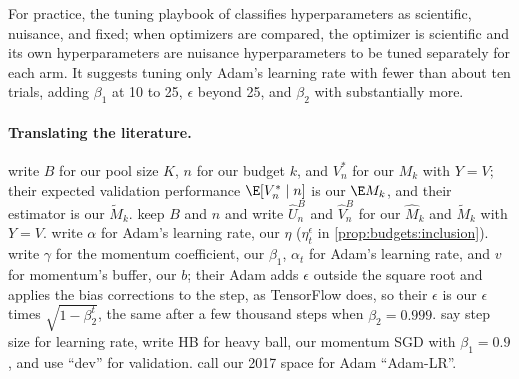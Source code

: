 \begin{refsection}
For practice, the tuning playbook of \textcite{GodboleEtAl2023} classifies hyperparameters as scientific, nuisance, and fixed; when optimizers are compared, the optimizer is scientific and its own hyperparameters are nuisance hyperparameters to be tuned separately for each arm. It suggests tuning only Adam's learning rate with fewer than about ten trials, adding $\beta_1$ at 10 to 25, $\epsilon$ beyond 25, and $\beta_2$ with substantially more.

\paragraph{Translating the literature.} \Textcite{DodgeEtAl2019} write $B$ for our pool size $K$, $n$ for our budget $k$, and $V^*_n$ for our $M_k$ with $Y=V$; their expected validation performance $\E[V^*_n\mid n]$ is our $\E M_k$, and their estimator is our $\tilde M_k$. \Textcite{TangEtAl2020} keep $B$ and $n$ and write $\hat U^B_n$ and $\hat V^B_n$ for our $\hat M_k$ and $\tilde M_k$ with $Y=V$. \Textcite{KingmaBa2015} write $\alpha$ for Adam's learning rate, our $\eta$ ($\eta^\epsilon_t$ in \cref{prop:budgets:inclusion}). \Textcite{ChoiEtAl2019} write $\gamma$ for the momentum coefficient, our $\beta_1$, $\alpha_t$ for Adam's learning rate, and $v$ for momentum's buffer, our $b$; their Adam adds $\epsilon$ outside the square root and applies the bias corrections to the step, as TensorFlow does, so their $\epsilon$ is our $\epsilon$ times $\sqrt{1-\beta_2^t}$, the same after a few thousand steps when $\beta_2=0.999$. \Textcite{WilsonEtAl2017} say step size for learning rate, write HB for heavy ball, our momentum SGD with $\beta_1=0.9$, and use \enquote{dev} for validation. \Textcite{SivaprasadEtAl2020} call our 2017 space for Adam \enquote{Adam-LR}.

\printchapterbib
\end{refsection}
